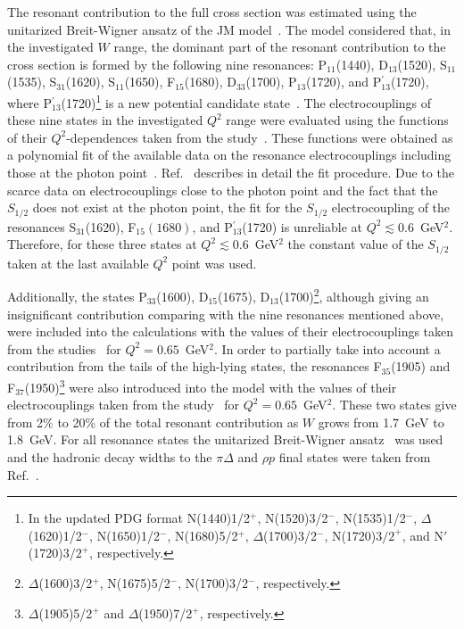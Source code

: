 \documentclass[prc,twocolumn,superscriptaddress,showpacs,amssymb,amsmath,amsfonts,aps,nofootinbib]{revtex4-1}
\begin{document}
The resonant contribution to the full cross section was estimated using the unitarized Breit-Wigner ansatz of the JM model~\cite{Mokeev:2012vsa}. 
The model considered that, in the investigated $W$ range, the dominant part of the resonant contribution to the cross section is formed by the following nine resonances: P$_{11}$(1440), D$_{13}$(1520), S$_{11}$(1535), S$_{31}$(1620), S$_{11}$(1650), F$_{15}$(1680), D$_{33}$(1700), P$_{13}$(1720), and P$^{'}_{13}$(1720), where P$^{'}_{13}$(1720)\footnote[3]{In the updated PDG format N(1440)1/2$^{+}$, N(1520)3/2$^{-}$, N(1535)1/2$^{-}$, $\Delta$(1620)1/2$^{-}$, N(1650)1/2$^{-}$, N(1680)5/2$^{+}$, $\Delta$(1700)3/2$^{-}$, N(1720)$3/2^{+}$, and N$'$(1720)$3/2^{+}$, respectively.} is a new potential candidate state~\cite{Mokeev:2015moa}. The electrocouplings of these nine states in the investigated $Q^{2}$ range were evaluated using the functions of their $Q^{2}$-dependences taken from the study~\cite{Isupov:2017lnd}. These functions were obtained as a polynomial fit of the available data on the resonance electrocouplings including those at the photon point~\cite{Mok_page,Dugger:2009pn,Aznauryan:2009mx,Mokeev:2012vsa,Mokeev:2015lda,Aznauryan:2009mx,Dalton:2008aa,Denizli:2007tq,Thompson:2000by,Armstrong:1998wg,Burkert:2002zz,Park:2014yea,Tiator:2011pw,Agashe:2014kda}. Ref.~\cite{Isupov:2017lnd} describes in detail the fit procedure. Due to the scarce data on electrocouplings close to the photon point  and the fact that the $S_{1/2}$ does not exist at the photon point, the fit for the $S_{1/2}$ electrocoupling of the resonances S$_{31}$(1620), F$_{15}(1680)$, and P$^{'}_{13}$(1720) is unreliable at $Q^{2} \lesssim 0.6$~GeV$^{2}$. Therefore, for these three states at $Q^{2} \lesssim 0.6$~GeV$^{2}$ the constant value of the $S_{1/2}$ taken at the last available $Q^{2}$ point was used. 



Additionally, the states P$_{33}$(1600), D$_{15}$(1675), D$_{13}$(1700)\footnote[4]{$\Delta$(1600)3/2$^{+}$, N(1675)5/2$^{-}$, N(1700)3/2$^{-}$, respectively.}, although giving an insignificant contribution comparing with the nine resonances mentioned above, were included into the calculations with the values of their electrocouplings taken from the studies~\cite{Mokeev:2015lda,Mokeev:2005re} for $Q^{2} =0.65$~GeV$^{2}$. In order to partially take into account a contribution from the tails of the high-lying states, the resonances F$_{35}$(1905) and F$_{37}$(1950)\footnote[5]{$\Delta$(1905)5/2$^{+}$ and $\Delta$(1950)7/2$^{+}$, respectively.}
were also introduced into the model with the values of their electrocouplings taken from the study~\cite{Mokeev:2005re} for $Q^{2} =0.65$~GeV$^{2}$. 
These two states give from 2\% to 20\% of the total resonant contribution as $W$ grows from 1.7~GeV to 1.8~GeV.
For all resonance states 
the unitarized Breit-Wigner ansatz~\cite{Mokeev:2012vsa} was used and the hadronic decay widths to the $\pi\Delta$ and $\rho p$ final
states were taken from Ref.~\cite{Mokeev:2015lda}.
\end{document}
